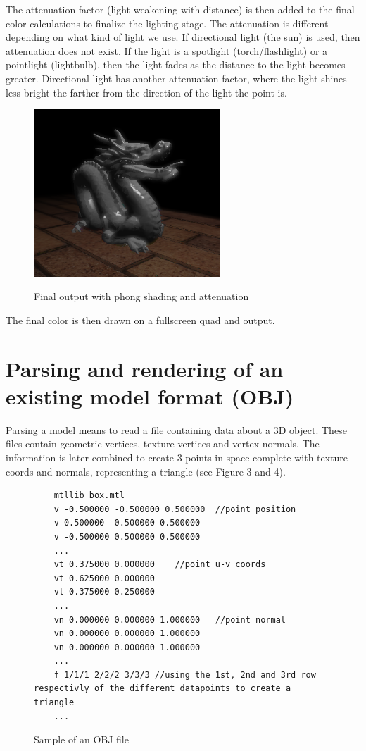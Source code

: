 \documentclass[a4paper,11pt]{article}
\begin{document}
The attenuation factor (light weakening with distance) is then added to the final color calculations to finalize the lighting stage. The attenuation is different depending on what kind of light we use. If directional light (the sun) is used, then attenuation does not exist. If the light is a spotlight (torch/flashlight) or a pointlight (lightbulb), then the light fades as the distance to the light becomes greater. Directional light has another attenuation factor, where the light shines less bright the farther from the direction of the light the point is.

\begin{figure}[ht!]
	\begin{center}
		\label{fin}
		\includegraphics[width=7cm]{pic/fin.png}
		\caption{Final output with phong shading and attenuation}
	\end{center}
\end{figure}

The final color is then drawn on a fullscreen quad and output.

\newpage
\section{Parsing and rendering of an existing model format (OBJ)}
Parsing a model means to read a file containing data about a 3D object. These files contain geometric vertices, texture vertices and vertex normals. The information is later combined to create 3 points in space complete with texture coords and normals, representing a triangle (see Figure 3 and 4).

\begin{figure}[ht!]
\begin{lstlisting}
	mtllib box.mtl
	v -0.500000 -0.500000 0.500000	//point position
	v 0.500000 -0.500000 0.500000
	v -0.500000 0.500000 0.500000
	...
	vt 0.375000 0.000000	//point u-v coords
	vt 0.625000 0.000000
	vt 0.375000 0.250000
	...
	vn 0.000000 0.000000 1.000000	//point normal
	vn 0.000000 0.000000 1.000000
	vn 0.000000 0.000000 1.000000
	...
	f 1/1/1 2/2/2 3/3/3	//using the 1st, 2nd and 3rd row respectivly of the different datapoints to create a triangle
	...
\end{lstlisting}
\caption{Sample of an OBJ file}
\end{figure}
\end{document}
